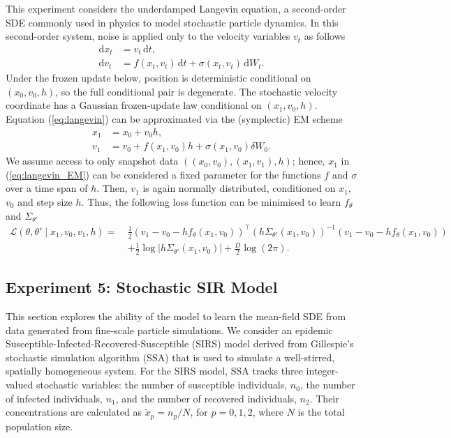 \documentclass{article}
\begin{document}
This experiment considers the underdamped Langevin equation, a second-order SDE commonly used in physics to model stochastic particle dynamics. In this second-order system, noise is applied only to the velocity variables $v_t$ as follows
\begin{equation}
\begin{aligned}
    \mathrm{d}x_t &= v_t \, \mathrm{d}t, \\
    \mathrm{d}v_t &= f(x_t, v_t) \, \mathrm{d}t + \sigma(x_t, v_t) \, \mathrm{d}W_t.
\end{aligned}
\label{eq:langevin}
\end{equation}
Under the frozen update below, position is deterministic conditional on $(x_0,v_0,h)$, so the full conditional pair is degenerate. The stochastic velocity coordinate has a Gaussian frozen-update law conditional on $(x_1,v_0,h)$. Equation (\ref{eq:langevin}) can be approximated via the (symplectic) EM scheme
\begin{equation}
\begin{aligned}
    x_1 &= x_0 + v_0 h, \\
    v_1 &= v_0 + f(x_1, v_0) h + \sigma(x_1, v_0) \delta W_0.
\end{aligned}
\label{eq:langevin_EM}
\end{equation}
We assume access to only snapshot data $((x_0, v_0), (x_1, v_1), h)$; hence,  $x_1$ in (\ref{eq:langevin_EM}) can be considered a fixed parameter for the functions $f$ and $\sigma$ over a time span of $h$. Then, $v_1$ is again normally distributed, conditioned on $x_1$, $v_0$ and step size $h$. Thus, the following loss function can be minimised to learn $f_\theta$ and $\Sigma_{\theta'}$
\begin{align*}
    \mathcal{L}(\theta, \theta' \mid x_1, v_0, v_1, h) =\
    &\frac{1}{2} (v_1 - v_0 - h f_\theta(x_1, v_0))^\top (h\Sigma_{\theta'}(x_1, v_0))^{-1} (v_1 - v_0 - h f_\theta(x_1, v_0)) \\
    &+ \frac{1}{2} \log |h\Sigma_{\theta'}(x_1, v_0)| + \frac{D}{2} \log(2\pi).
\end{align*}


\subsection{Experiment 5: Stochastic SIR Model}
This section explores the ability of the model to learn the mean-field SDE from data generated from fine-scale particle simulations.  We consider an epidemic Susceptible-Infected-Recovered-Susceptible (SIRS) model \cite{Dietrich2023} derived from Gillespie's stochastic simulation algorithm (SSA) \cite{Gillespie_Alg} that is used to simulate a well-stirred, spatially homogeneous system. For the SIRS model, SSA tracks three integer-valued stochastic variables: the number of susceptible individuals, $n_0$, the number of infected individuals, $n_1$, and the number of recovered individuals, $n_2$.  Their concentrations are calculated as $\tilde{x}_p = n_p/N$, for $p = 0, 1, 2$, where $N$ is the total population size.
\end{document}
